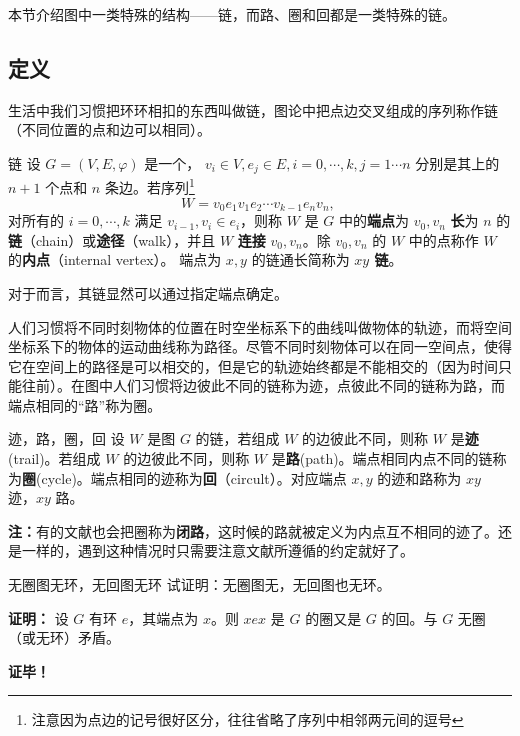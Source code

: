 
本节介绍图中一类特殊的结构——链，而路、圈和回都是一类特殊的链。

\subsection{定义}
生活中我们习惯把环环相扣的东西叫做链，图论中把点边交叉组成的序列称作链（不同位置的点和边可以相同）。

\begin{definition}{链}
设 $G=(V,E,\varphi)$ 是一个， $v_i\in V,e_j\in E,i=0,\cdots,k,j=1\cdots n$ 分别是其上的 $n+1$ 个点和 $n$ 条边。若序列\footnote{注意因为点边的记号很好区分，往往省略了序列中相邻两元间的逗号}
\begin{equation}
W=v_0 e_1v_1e_2\cdots v_{k-1} e_nv_n,~
\end{equation}
对所有的 $i=0,\cdots,k$ 满足 $v_{i-1},v_{i}\in e_{i}$，则称 $W$ 是 $G$ 中的\textbf{端点}为 $v_0,v_n$ \textbf{长}为 $n$ 的\textbf{链}（chain）或\textbf{途径}（walk），并且 $W$ \textbf{连接} $v_0,v_n$。除 $v_0,v_n$ 的 $W$ 中的点称作 $W$ 的\textbf{内点}（internal vertex）。 端点为 $x,y$ 的链通长简称为 \textbf{$xy$ 链}。
\end{definition}
对于而言，其链显然可以通过指定端点确定。

人们习惯将不同时刻物体的位置在时空坐标系下的曲线叫做物体的轨迹，而将空间坐标系下的物体的运动曲线称为路径。尽管不同时刻物体可以在同一空间点，使得它在空间上的路径是可以相交的，但是它的轨迹始终都是不能相交的（因为时间只能往前）。在图中人们习惯将边彼此不同的链称为迹，点彼此不同的链称为路，而端点相同的“路”称为圈。
\begin{definition}{迹，路，圈，回}\label{def_PatCyc_2}
设 $W$ 是图 $G$ 的链，若组成 $W$ 的边彼此不同，则称 $W$ 是\textbf{迹}(trail)。若组成 $W$ 的边彼此不同，则称 $W$ 是\textbf{路}(path)。端点相同内点不同的链称为\textbf{圈}(cycle)。端点相同的迹称为\textbf{回}（circult）。对应端点 $x,y$ 的迹和路称为 $xy$ 迹，$xy$ 路。
\end{definition}
\textbf{注：}有的文献也会把圈称为\textbf{闭路}，这时候的路就被定义为内点互不相同的迹了。还是一样的，遇到这种情况时只需要注意文献所遵循的约定就好了。

\begin{example}{无圈图无环，无回图无环}
试证明：无圈图无，无回图也无环。

\textbf{证明：}
设 $G$ 有环 $e$，其端点为 $x$。则 $xex$ 是 $G$ 的圈又是 $G$ 的回。与 $G$ 无圈（或无环）矛盾。

\textbf{证毕！}
\end{example}


